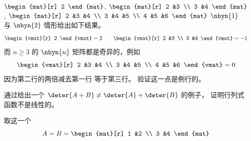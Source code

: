 \begin{exercises}
    \begin{answer}
      \begin{exparts}
        \partsitem 
          $\begin{mat}[r]
            2
          \end{mat}$,
          $\begin{mat}[r]
            2  &3  \\
            3  &4
          \end{mat}$,
          $\begin{mat}[r]
            2  &3  &4  \\
            3  &4  &5  \\
            4  &5  &6
          \end{mat}$
        \partsitem $\nbyn{1}$ 与 $\nbyn{2}$ 情形给出如下结果。
          \begin{equation*}
            \begin{vmat}[r]
              2
            \end{vmat}
            =2
            \qquad
            \begin{vmat}[r]
              2  &3  \\
              3  &4
            \end{vmat}=-1
          \end{equation*}
          而 $n\geq 3$ 的 $\nbyn{n}$ 矩阵都是奇异的，例如
          \begin{equation*}
            \begin{vmat}[r]
              2  &3  &4  \\
              3  &4  &5  \\
              4  &5  &6
            \end{vmat}=0
          \end{equation*}
          因为第二行的两倍减去第一行
          等于第三行。
          验证这一点是例行的。
      \end{exparts} 
    \end{answer}
  \recommended \item 
    通过给出一个 \( \deter{A+B}\neq\deter{A}+\deter{B} \) 的例子，
    证明行列式函数不是线性的。
    \begin{answer}
      取这一个
      \begin{equation*}
         A=B=
         \begin{mat}[r]
           1  &2  \\
           3  &4
         \end{mat}
      \end{equation*}

\end{answer}
\end{exercises}
